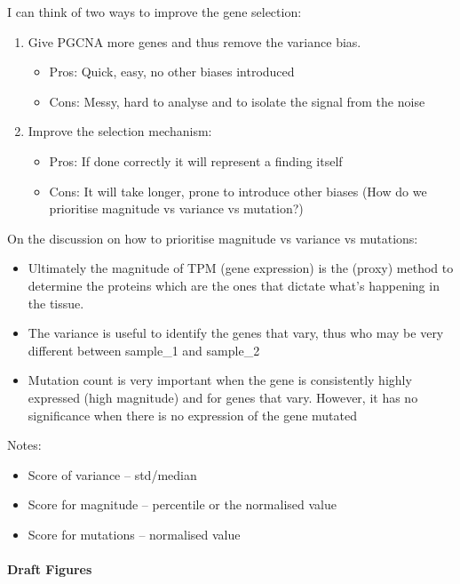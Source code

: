 I can think of two ways to improve the gene selection:
\begin{enumerate}
    \item Give PGCNA more genes and thus remove the variance bias.
          \begin{itemize}
              \item Pros: Quick, easy, no other biases introduced
              \item Cons: Messy, hard to analyse and to isolate the signal from the noise
          \end{itemize}
    \item Improve the selection mechanism:
          \begin{itemize}
              \item Pros: If done correctly it will represent a finding itself
              \item Cons: It will take longer, prone to introduce other biases (How do we prioritise magnitude vs variance vs mutation?)
          \end{itemize}
\end{enumerate}

On the discussion on how to prioritise magnitude vs variance vs mutations:
\begin{itemize}
    \item Ultimately the magnitude of TPM (gene expression) is the (proxy) method to determine the proteins which are the ones that dictate what's happening in the tissue.
    \item The variance is useful to identify the genes that vary, thus who may be very different between sample\_1 and sample\_2
    \item Mutation count is very important when the gene is consistently highly expressed (high magnitude) and for genes that vary. However, it has no significance when there is no expression of the gene mutated
\end{itemize}


Notes:
\begin{itemize}
    \item Score of variance – std/median
    \item Score for magnitude – percentile or the normalised value
    \item Score for mutations – normalised value
\end{itemize}

\paragraph{Draft Figures}

